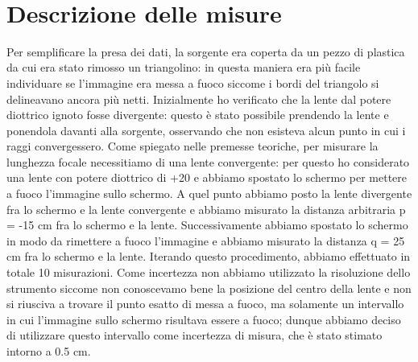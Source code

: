 \documentclass{article}
\begin{document}
\noindent ~\hrulefill 
	
	\section{Descrizione delle misure}
Per semplificare la presa dei dati, la sorgente era coperta da un pezzo di plastica da cui era stato rimosso un triangolino: in questa maniera era più facile individuare se l'immagine era messa a fuoco siccome i bordi del triangolo si delineavano ancora più netti. Inizialmente ho verificato che la lente dal potere diottrico ignoto fosse divergente: questo è stato possibile prendendo la lente e ponendola davanti alla sorgente, osservando che non esisteva alcun punto in cui i raggi convergessero. Come spiegato nelle premesse teoriche, per misurare la lunghezza focale necessitiamo di una lente convergente: per questo ho considerato una lente con potere diottrico di +20 e abbiamo spostato lo schermo per mettere a fuoco l'immagine sullo schermo. A quel punto abbiamo posto la lente divergente fra lo schermo e la lente convergente e abbiamo misurato la distanza arbitraria p = -15 cm fra lo schermo e la lente. Successivamente abbiamo spostato lo schermo in modo da rimettere a fuoco l'immagine e abbiamo misurato la distanza q = 25 cm fra lo schermo e la lente. Iterando questo procedimento, abbiamo effettuato in totale 10 misurazioni. Come incertezza non abbiamo utilizzato la risoluzione dello strumento siccome non conoscevamo bene la posizione del centro della lente e non si riusciva a trovare il punto esatto di messa a fuoco, ma solamente un intervallo in cui l'immagine sullo schermo risultava essere a fuoco; dunque abbiamo deciso di utilizzare questo intervallo come incertezza di misura, che è stato stimato intorno a 0.5 cm.

	

\clearpage
\end{document}

